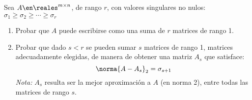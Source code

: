 \begin{enunciado}{\ejercicio}
  Sea $A \en \reales^{m \times n}$, de rango $r$, con valores singulares no nulos: $\sigma_1 \geq \sigma_2 \geq \cdots \geq \sigma_r$
  \begin{enumerate}[label=(\alph*)]
    \item Probar que $A$ puede escribirse como una suma de $r$ matrices de rango 1.

    \item Probar que dado $s < r$ se pueden sumar $s$ matrices de rango 1, matrices adecuadamente elegidas, de manera de obtener
          una matriz $A_s$ que satisface:
          $$
            \norma{A - A_s}_2 = \sigma_{s+1}
          $$
          \textit{Nota:} $A_s$ resulta ser la mejor aproximación a $A$ (en norma 2), entre todas las matrices de rango $s$.
  \end{enumerate}
\end{enunciado}

